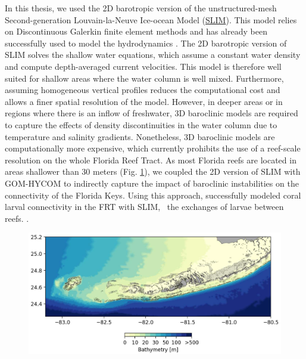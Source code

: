 In this thesis, we used the 2D barotropic version of the unstructured-mesh Second-generation Louvain-la-Neuve Ice-ocean Model (\href{https://www.slim-ocean.be/}{SLIM}). This model relies on Discontinuous Galerkin finite element methods \citep{aizinger2002discontinuous} and has already been successfully used to model the hydrodynamics . The 2D barotropic version of SLIM solves the shallow water equations, which assume a constant water density and compute depth-averaged current velocities. This model is therefore well suited for shallow areas where the water column is well mixed. Furthermore, assuming homogeneous vertical profiles reduces the computational cost and allows a finer spatial resolution of the model. However, in deeper areas or in regions where there is an inflow of freshwater, 3D baroclinic models are required to capture the effects of density discontinuities in the water column due to temperature and salinity gradients. Nonetheless, 3D baroclinic models are computationally more expensive, which currently prohibits the use of a reef-scale resolution on the whole Florida Reef Tract. As most Florida reefs are located in areas shallower than 30 meters (Fig. \ref{intro:bathy}), we coupled the 2D version of SLIM with GOM-HYCOM to indirectly capture the impact of baroclinic instabilities on the connectivity of the Florida Keys. Using this approach, \cite{frys2020fine} successfully modeled coral larval connectivity in the FRT with SLIM, \ie~the exchanges of larvae between reefs. .

\begin{figure}
	\centering
	\includegraphics[width=\textwidth]{chapters/intro/figures/bathymetry_figure.png}
	\caption{}
	\label{intro:bathy}
\end{figure}

